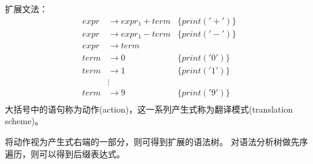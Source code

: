 扩展文法：
\[\begin{array}{rll}
expr &\to expr_1 + term & \{print('+')\}\\
expr &\to expr_1 - term & \{print('-')\}\\
expr &\to term & \\
term &\to 0    & \{print('0')\}\\
term &\to 1    & \{print('1')\}\\
     &\vdots   & \\
term &\to 9    & \{print('9')\}\\
\end{array}\]
大括号中的语句称为动作(action)，这一系列产生式称为翻译模式(translation scheme)。

将动作视为产生式右端的一部分，则可得到扩展的语法树。
对语法分析树做先序遍历，则可以得到后缀表达式。